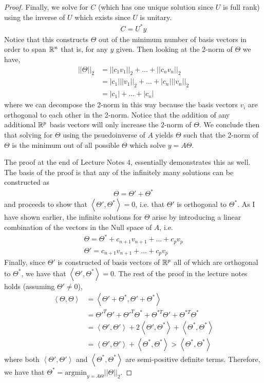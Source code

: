 \documentclass{article}
\begin{document}
\begin{proof}
    Finally, we solve for $C$ (which has one unique solution since $U$ is full
    rank) using the inverse of $U$ which exists since $U$ is
    unitary. 
    \begin{gather*}
        C = U^*y
    \end{gather*}
    Notice that this constructs $\Theta$ out of the minimum number of basis
    vectors in order to span $\mathbb{R}^{n}$ that is, for any $y$ given. Then looking at
    the 2-norm of $\Theta$ we have, 
    \begin{align*}
        ||\Theta||_2 &= ||c_1v_1||_2 + \ldots + ||c_nv_n||_2\\
         &= |c_1|||v_1||_2 + \ldots + |c_n|||v_n||_2\\
         &= |c_1| + \ldots + |c_n|
    \end{align*}
    where we can decompose the 2-norm in this way because the basis vectors
    $v_i$ are orthogonal to each other in the 2-norm. Notice that the addition
    of any additional $\mathbb{R}^{p}$ basis vectors will only increase the 2-norm of
    $\Theta$. We conclude then that solving for $\Theta$ using the psuedoinverse
    of $A$ yields $\Theta$ such that the 2-norm of $\Theta$ is the minimum out
    of all possible $\Theta$ which solve $y=A\Theta$. 

    The proof at the end of Lecture Notes 4, essentially demonstrates this as
    well. The basis of the proof is that any of the infinitely many solutions
    can be constructed as
    \begin{gather*}
        \Theta = \Theta' + \Theta^*
    \end{gather*}
    and proceeds to show that $\left<\Theta', \Theta^*\right> = 0$, i.e. that
    $\Theta'$ is orthogonal to $\Theta^*$. As I have shown earlier, the infinite
    solutions for $\Theta$ arise by introducing a linear combination of the
    vectors in the Null space of $A$, i.e.
    \begin{gather*}
        \Theta = \Theta^* + c_{n+1}v_{n+1} + \ldots + c_pv_p\\
        \Theta' = c_{n+1}v_{n+1} + \ldots + c_pv_p
    \end{gather*}
    Finally, since $\Theta'$ is constructed of basis vectors of $\mathbb{R}^p$ all of
    which are orthogonal to $\Theta^*$, we have that
    $\left<\Theta',\Theta^*\right> = 0$. The rest of the proof in the lecture
    notes holds (assuming $\Theta' \ne 0$), 
    \begin{align*}
        \left<\Theta, \Theta\right> &=
        \left<\Theta'+\Theta^*,\Theta'+\Theta^*\right>\\
        &= \Theta'^T\Theta' + \Theta'^T\Theta^* + \Theta^{*T}\Theta' +
        \Theta^{*T}\Theta^*\\
        &= \left<\Theta',\Theta'\right> + 2\left<\Theta',\Theta^*\right> +
        \left<\Theta^*, \Theta^*\right>\\
        &= \left<\Theta',\Theta'\right> + \left<\Theta^*,\Theta^*\right> > \left<\Theta^*,\Theta^*\right>
    \end{align*}
    where both $\left<\Theta', \Theta'\right>$ and $\left<\Theta^*,
    \Theta^*\right>$ are semi-positive definite terms. Therefore, we have that
    $\Theta^* = \text{argmin}_{y=A\Theta}||\Theta||_2$. 


\end{proof}
\end{document}
